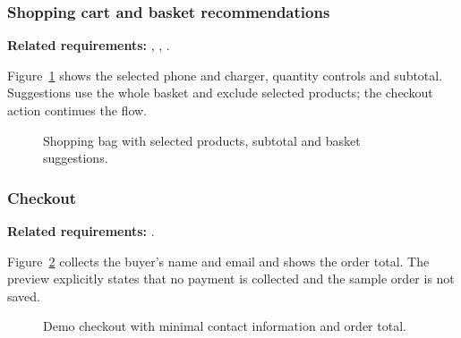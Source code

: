 \begin{samepage}
\subsubsection{Shopping cart and basket recommendations}
\label{sec:prototype-cart-view}

\textbf{Related requirements:} , , .

Figure~\ref{fig:prototype-cart} shows the selected phone and charger, quantity
controls and subtotal. Suggestions use the whole basket and exclude selected
products; the checkout action continues the flow.

\nopagebreak[4]
\begin{figure}[H]
  \centering
  \caption{Shopping bag with selected products, subtotal and basket suggestions.}
  \label{fig:prototype-cart}
\end{figure}
\end{samepage}

\begin{samepage}
\subsubsection{Checkout}
\label{sec:prototype-checkout-view}

\textbf{Related requirements:} .

Figure~\ref{fig:prototype-checkout} collects the buyer's name and email and shows
the order total. The preview explicitly states that no payment is collected and
the sample order is not saved.

\nopagebreak[4]
\begin{figure}[H]
  \centering
  \caption{Demo checkout with minimal contact information and order total.}
  \label{fig:prototype-checkout}
\end{figure}
\end{samepage}

